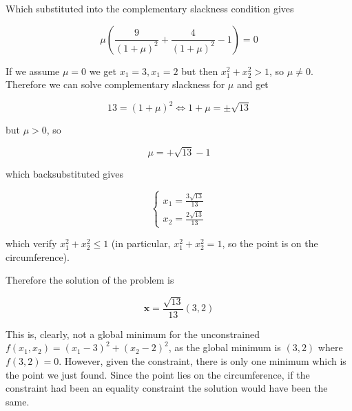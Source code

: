 \documentclass{article}
\begin{document}
Which substituted into the complementary slackness condition gives

$$
\mu (\frac{9}{(1 + \mu)^2} + \frac{4}{(1 + \mu)^2} - 1) = 0
$$

If we assume $\mu = 0$ we get $x_1 = 3, x_1 = 2$ but then $x_1^2 + x_2^2 > 1$, so $\mu \neq 0$. 
Therefore we can solve complementary slackness for $\mu$ and get

$$13 = (1 + \mu)^2 \iff 1 + \mu = \pm \sqrt{13}$$

but $\mu > 0$, so

$$\mu = + \sqrt{13} - 1$$

which backsubstituted gives

\begin{equation*}
\begin{cases}
x_1 = \frac{3\sqrt{13}}{13} \\
x_2 = \frac{2\sqrt{13}}{13} 
\end{cases}
\end{equation*}

which verify $x_1^2 + x_2^2 \leq 1$ (in particular, $x_1^2 + x_2^2 = 1$, so the point is on the circumference). 

Therefore the solution of the problem is 

$$
\mathbf{x} = \frac{\sqrt{13}}{13} (3, 2)
$$

This is, clearly, not a global minimum for the unconstrained $f(x_1, x_2) = (x_1 - 3)^2 + (x_2 - 2)^2$, as the global minimum is $(3, 2)$ where $f(3, 2) = 0$. 
However, given the constraint, there is only one minimum which is the point we just found. 
Since the point lies on the circumference, if the constraint had been an equality constraint the solution would have been the same. 
\end{document}
